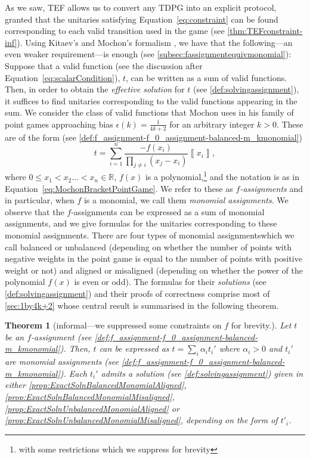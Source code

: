 \documentclass{article}
\newtheorem{theorem}{Theorem}\newtheorem{lemma}[theorem]{Lemma}\newtheorem{proposition}[theorem]{Proposition}\newtheorem{corollary}[theorem]{Corollary}\newtheorem{definition}[theorem]{Definition}\newtheorem{claim}[theorem]{Claim}\newtheorem{remark}[theorem]{Remark}\newtheorem{example}[theorem]{Example}
\begin{document}
As we saw, TEF allows us to convert any TDPG into an explicit protocol, granted that
the unitaries satisfying Equation~\eqref{eq:constraint} can be found corresponding
to each valid transition
used in the game (see \cref{thm:TEFconstraint-inf}). Using Kitaev's and Mochon's
formalism \cite{Mochon07}, we have that the following---an even weaker
requirement---is enough (see \cref{subsec:fassignmentequivmonomial}): Suppose that a valid function (see the discussion after Equation~\eqref{eq:scalarCondition}), $t$, can be written
as a sum of valid functions. Then, in order to obtain the \emph{effective solution} for $t$ (see \cref{def:solvingassignment}), it suffices to find unitaries corresponding
to the valid functions appearing in the sum.
We consider the class of valid functions that Mochon uses in his family
of point games approaching bias $\epsilon(k)=\frac{1}{4k+2}$ for an arbitrary integer $k>0$.
These are of the form (see \cref{def:f_assignment-f_0_assignment-balanced-m_kmonomial})
\begin{displaymath}
  t=\sum_{i=1}^{n}\frac{-f(x_{i})}{\prod_{j\neq i}(x_{j}-x_{i})}\left\llbracket x_{i}\right\rrbracket,
\end{displaymath}
where $0\le x_{1}<x_{2}\dots<x_{n}\in \mathbb{R}$, $f(x)$ is a polynomial,\footnote{with some restrictions which we suppress for brevity} and the notation is as in Equation~\eqref{eq:MochonBracketPointGame}.
We refer to these as \emph{$f$-assignments} and in particular, when
$f$ is a monomial, we call them \emph{monomial assignments}. We observe that the $f$-assignments
can be expressed as a sum of monomial assignments, and we give formulas for the unitaries corresponding to these monomial assignments. There
are four types of monomial assignments\textemdash which we call balanced or unbalanced (depending on whether the number of points with negative weights in the point game is equal to the number of points with positive weight or not) and
aligned or misaligned (depending on whether the power of the polynomial $f(x)$ is even or odd). The formulas for their \emph{solutions} (see \cref{def:solvingassignment}) and their
proofs of correctness comprise most of \cref{sec:1by4k+2} whose central result is summarised in the following theorem.

\begin{theorem}[informal---we suppressed some constraints on $f$ for brevity.]
  Let $t$ be an $f$-assignment (see \cref{def:f_assignment-f_0_assignment-balanced-m_kmonomial}).
  Then, $t$ can be expressed as $t=\sum_{i}\alpha_{i}t_{i}'$ where
  $\alpha_{i}>0$ and $t_{i}'$ are monomial assignments (see \cref{def:f_assignment-f_0_assignment-balanced-m_kmonomial}).
  Each $t_{i}'$ admits a solution (see \cref{def:solvingassignment}) given in either  \cref{prop:ExactSolnBalancedMonomialAligned},
  \cref{prop:ExactSolnBalancedMonomialMisaligned}, \cref{prop:ExactSolnUnbalancedMonomialAligned}
  or \cref{prop:ExactSolnUnbalancedMonomialMisaligned}, depending on
  the form of $t'_{i}$. \label{thm:Main}
\end{theorem}
\end{document}
